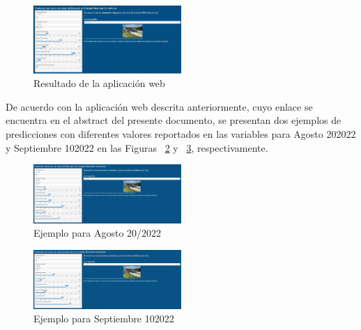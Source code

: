 \documentclass[conference, 10pt]{IEEEtran}
\begin{document}
\begin{figure}[htbp]
\centerline{\includegraphics[width=0.5\textwidth]{../Images/Resultado_Trabajo_final.png}}
\caption{Resultado de la aplicación web}
\label{fig_3}
\end{figure}
De acuerdo con la aplicación web descrita anteriormente, cuyo enlace se encuentra en el abstract del presente documento, se presentan dos ejemplos de predicciones con diferentes valores reportados en las variables para Agosto 20\/2022 y Septiembre 10\/2022 en las Figuras ~\ref{fig_4}  y ~\ref{fig_5}, respectivamente.

\begin{figure}[htbp]
\centerline{\includegraphics[width=0.5\textwidth]{../Images/AppWeb1.png}}
\caption{Ejemplo para Agosto 20/2022}
\label{fig_4}
\end{figure}


\begin{figure}[htbp]
\centerline{\includegraphics[width=0.5\textwidth]{../Images/AppWeb2.png}}
\caption{Ejemplo para Septiembre 10\/2022}
\label{fig_5}
\end{figure}
\end{document}
